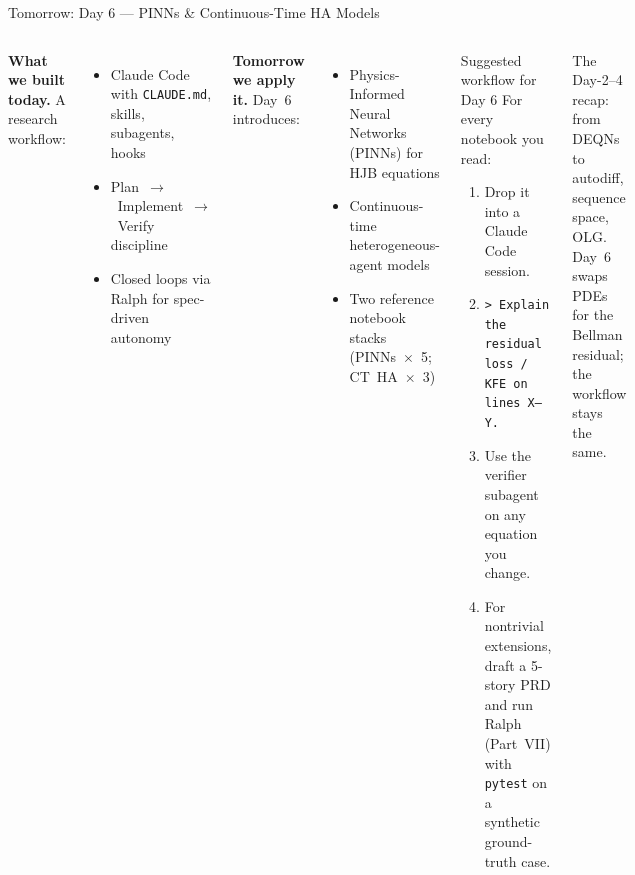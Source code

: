 \documentclass[aspectratio=169,10pt]{beamer}
\newcommand{\emphc}[1]{\textcolor{harvardcrimson}{#1}}
\begin{document}
\begin{frame}{Tomorrow: Day 6 --- PINNs \& Continuous-Time HA Models}
\small
\begin{columns}[T]
\textbf{What we built today.} A research workflow:
\begin{itemize}\itemsep0pt
    \item Claude Code with \texttt{CLAUDE.md}, skills, subagents, hooks
    \item Plan~$\to$~Implement~$\to$~Verify discipline
    \item \emphc{Closed loops} via Ralph for spec-driven autonomy
\end{itemize}

\vspace{0.4em}
\textbf{Tomorrow we apply it.} Day~6 introduces:
\begin{itemize}\itemsep0pt
    \item \emphc{Physics-Informed Neural Networks} (PINNs) for HJB equations
    \item Continuous-time \emphc{heterogeneous-agent} models
    \item Two reference notebook stacks (PINNs~$\times$~5; CT~HA~$\times$~3)
\end{itemize}

\begin{block}{Suggested workflow for Day 6}
\scriptsize
For every notebook you read:
\begin{enumerate}\itemsep0pt
  \item Drop it into a Claude Code session.
  \item \texttt{> Explain the residual loss / KFE on lines~X--Y.}
  \item Use the \emphc{verifier} subagent on any equation you change.
  \item For nontrivial extensions, draft a 5-story PRD and run Ralph
        (Part~VII) with \texttt{pytest} on a synthetic ground-truth case.
\end{enumerate}
\end{block}

\vspace{0.3em}
{\scriptsize The \emphc{Day-2--4 recap}: from DEQNs to autodiff, sequence space, OLG.
Day~6 swaps PDEs for the Bellman residual; the workflow stays the same.}
\end{columns}
\end{frame}
\end{document}
